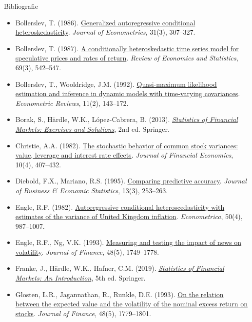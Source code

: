 \begin{frame}{Bibliografie}
\itemsize{\tiny}
\begin{itemize}
    \item Bollerslev, T. (1986). \href{https://doi.org/10.1016/0304-4076(86)90063-1}{Generalized autoregressive conditional heteroskedasticity}. \textit{Journal of Econometrics}, 31(3), 307--327.
    \item Bollerslev, T. (1987). \href{https://doi.org/10.2307/1925546}{A conditionally heteroskedastic time series model for speculative prices and rates of return}. \textit{Review of Economics and Statistics}, 69(3), 542--547.
    \item Bollerslev, T., Wooldridge, J.M. (1992). \href{https://doi.org/10.1080/07474939208800229}{Quasi-maximum likelihood estimation and inference in dynamic models with time-varying covariances}. \textit{Econometric Reviews}, 11(2), 143--172.
    \item Borak, S., Härdle, W.K., López-Cabrera, B. (2013). \href{https://doi.org/10.1007/978-3-642-33929-5}{\textit{Statistics of Financial Markets: Exercises and Solutions}}, 2nd ed. Springer.
    \item Christie, A.A. (1982). \href{https://doi.org/10.1016/0304-405X(82)90018-6}{The stochastic behavior of common stock variances: value, leverage and interest rate effects}. \textit{Journal of Financial Economics}, 10(4), 407--432.
    \item Diebold, F.X., Mariano, R.S. (1995). \href{https://doi.org/10.1080/07350015.1995.10524599}{Comparing predictive accuracy}. \textit{Journal of Business \& Economic Statistics}, 13(3), 253--263.
    \item Engle, R.F. (1982). \href{https://doi.org/10.2307/1912773}{Autoregressive conditional heteroscedasticity with estimates of the variance of United Kingdom inflation}. \textit{Econometrica}, 50(4), 987--1007.
    \item Engle, R.F., Ng, V.K. (1993). \href{https://doi.org/10.1111/j.1540-6261.1993.tb05127.x}{Measuring and testing the impact of news on volatility}. \textit{Journal of Finance}, 48(5), 1749--1778.
    \item Franke, J., Härdle, W.K., Hafner, C.M. (2019). \href{https://doi.org/10.1007/978-3-030-13751-9}{\textit{Statistics of Financial Markets: An Introduction}}, 5th ed. Springer.
    \item Glosten, L.R., Jagannathan, R., Runkle, D.E. (1993). \href{https://doi.org/10.1111/j.1540-6261.1993.tb05128.x}{On the relation between the expected value and the volatility of the nominal excess return on stocks}. \textit{Journal of Finance}, 48(5), 1779--1801.

\end{itemize}
\end{frame}
